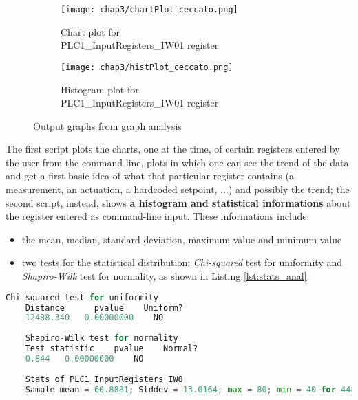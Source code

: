 \begin{figure}[ht]
	\centering
	\begin{subfigure}{0.48\textwidth}
		\texttt{[image: chap3/chartPlot\_ceccato.png]}
		\caption{Chart plot for\\ PLC1\_InputRegisters\_IW01 register}
		\label{subfig:chart_plot_ceccato}
	\end{subfigure}
	\hfill
	\begin{subfigure}{0.48\textwidth}
		\texttt{[image: chap3/histPlot\_ceccato.png]}
		\caption{Histogram plot for\\ PLC1\_InputRegisters\_IW01 register}
		\label{subfig:hist_plot_ceccato}
	\end{subfigure}
	\caption{Output graphs from graph analysis}
	\label{fig:ceccato_graphs}
\end{figure}

The first script plots the charts, one at the time, of certain registers entered by the user from the command line, plots in which one can see the trend of the data and get a first basic idea of what that particular register contains (a measurement, an actuation, a hardcoded setpoint, ...) and possibly the trend; the second script, instead, shows \textbf{a histogram and statistical informations} about the register entered as command-line input. These informations include:

\begin{itemize}
	\item the mean, median, standard deviation, maximum value and minimum value
	
	\item two tests for the statistical distribution: \textit{Chi-squared} test for uniformity and \textit{Shapiro-Wilk} test for normality, as shown in Listing \ref{lst:stats_anal}:

\end{itemize}

\begin{lstlisting}[language=Python,numbers=none,caption={Statistical data for PLC1\_InputRegisters\_IW0 register},label=lst:stats_anal]
	Chi-squared test for uniformity
	Distance      pvalue    Uniform?
	12488.340   0.00000000    NO    
	
	Shapiro-Wilk test for normality
	Test statistic    pvalue    Normal? 
	0.844   0.00000000    NO    
	
	Stats of PLC1_InputRegisters_IW0
	Sample mean = 60.8881; Stddev = 13.0164; max = 80; min = 40 for 4488 values
\end{lstlisting}

